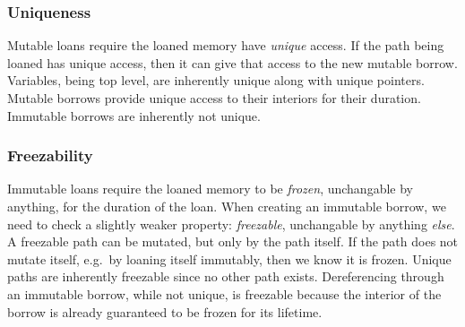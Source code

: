 

\subsubsection*{Uniqueness}
Mutable loans require the loaned memory have \emph{unique} access.
If the path being loaned has unique access, then it can give that access to the 
new mutable borrow.
Variables, being top level, are inherently unique along with unique pointers.
Mutable borrows provide unique access to their interiors for their duration.
Immutable borrows are inherently not unique.
\newline



\subsubsection*{Freezability}
Immutable loans require the loaned memory to be \emph{frozen}, 
unchangable by anything, for the duration of the loan.
When creating an immutable borrow, we need to check a slightly weaker property:
\emph{freezable}, unchangable by anything \emph{else}.
A freezable path can be mutated, but only by the path itself.
If the path does not mutate itself, e.g.\ by loaning itself immutably, then we know it is frozen.
Unique paths are inherently freezable since no other path exists.
Dereferencing through an immutable borrow, while not unique, is freezable because
the interior of the borrow is already guaranteed to be frozen for its lifetime.
\newline

